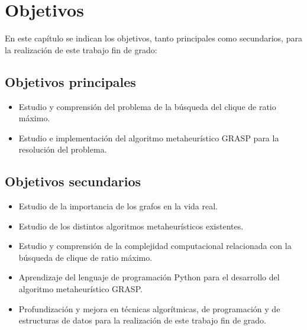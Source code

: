 
\chapter{Objetivos} %

\label{Chapter2}


En este capítulo se indican los objetivos, tanto principales como secundarios, para la realización de este trabajo fin de grado:

\section{Objetivos principales}
\begin{itemize}
	\item Estudio y comprensión del problema de la búsqueda del clique de ratio máximo.
	\item Estudio e implementación del algoritmo metaheurístico GRASP para la resolución del problema.
\end{itemize}

\section{Objetivos secundarios}
\begin{itemize}
	\item Estudio de la importancia de los grafos en la vida real.
	\item Estudio de los distintos algoritmos metaheurísticos existentes.
	\item Estudio y comprensión de la complejidad computacional relacionada con la búsqueda de clique de ratio máximo.
	\item Aprendizaje del lenguaje de programación Python para el desarrollo del algoritmo metaheurístico GRASP.
	\item Profundización y mejora en técnicas algorítmicas, de programación y de estructuras de datos para la realización de este trabajo fin de grado.
\end{itemize}


